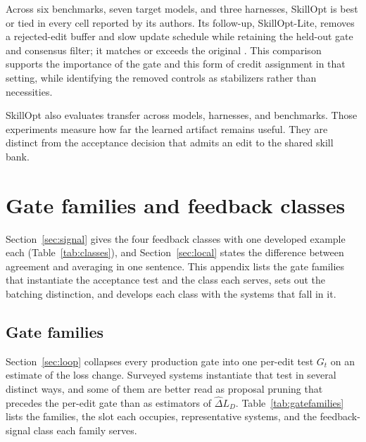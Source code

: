 Across six benchmarks, seven target models, and three harnesses, SkillOpt is best or tied in every cell reported by its authors. Its follow-up, SkillOpt-Lite, removes a rejected-edit buffer and slow update schedule while retaining the held-out gate and consensus filter; it matches or exceeds the original \citep{shen2026skilloptlite}. This comparison supports the importance of the gate and this form of credit assignment in that setting, while identifying the removed controls as stabilizers rather than necessities.

SkillOpt also evaluates transfer across models, harnesses, and benchmarks. Those experiments measure how far the learned artifact remains useful. They are distinct from the acceptance decision that admits an edit to the shared skill bank.

\section{Gate families and feedback classes}\label{app:gates}

Section~\ref{sec:signal} gives the four feedback classes with one developed example each (Table~\ref{tab:classes}), and Section~\ref{sec:local} states the difference between agreement and averaging in one sentence. This appendix lists the gate families that instantiate the acceptance test and the class each serves, sets out the batching distinction, and develops each class with the systems that fall in it.

\subsection{Gate families}\label{gate-families}

Section~\ref{sec:loop} collapses every production gate into one per-edit test \(G_t\) on an estimate of the loss change. Surveyed systems instantiate that test in several distinct ways, and some of them are better read as proposal pruning that precedes the per-edit gate than as estimators of \(\widehat{\Delta} L_D\). Table~\ref{tab:gatefamilies} lists the families, the slot each occupies, representative systems, and the feedback-signal class each family serves.

